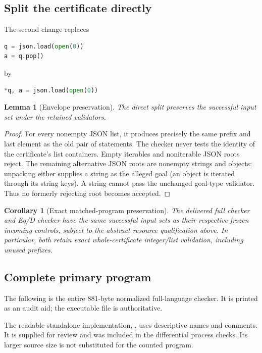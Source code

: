 \documentclass[11pt]{article}
\newtheorem{lemma}[theorem]{Lemma}
\newtheorem{corollary}[theorem]{Corollary}
\theoremstyle{definition}\newtheorem{definition}[theorem]{Definition}
\theoremstyle{remark}\newtheorem{remark}[theorem]{Remark}
\begin{document}
\subsection{Split the certificate directly}

The second change replaces
\begin{lstlisting}[language=Python]
q = json.load(open(0))
a = q.pop()
\end{lstlisting}
by
\begin{lstlisting}[language=Python]
*q, a = json.load(open(0))
\end{lstlisting}

\begin{lemma}[Envelope preservation]
The direct split preserves the successful input set under the retained
validators.
\end{lemma}
\begin{proof}
For every nonempty JSON list, it produces precisely the same prefix
and last element as the old pair of statements. The checker never tests
the identity of the certificate's list containers. Empty iterables and
noniterable JSON roots reject.
The remaining alternative JSON roots are nonempty strings and objects:
unpacking either supplies a string as the alleged goal (an object is
iterated through its string keys). A string cannot pass the unchanged
goal-type validator. Thus no formerly rejecting root becomes accepted.
\end{proof}

\begin{corollary}[Exact matched-program preservation]
The delivered full checker and Eq/D checker have the same successful
input sets as their respective frozen incoming controls, subject to the
abstract resource qualification above. In particular, both retain exact
whole-certificate integer/list validation, including unused prefixes.
\end{corollary}

\noindent\begin{minipage}{\textwidth}
\subsection{Complete primary program}

The following is the entire 881-byte normalized full-language checker.
It is printed as an audit aid; the executable file is authoritative.

The readable standalone implementation, ,
uses descriptive names and comments. It is supplied for review and was
included in the differential process checks. Its larger source size is
not substituted for the counted program.
\end{minipage}
\end{document}
